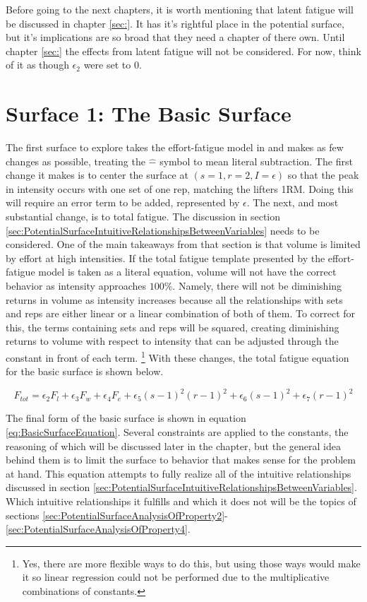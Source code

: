Before going to the next chapters, it is worth mentioning that latent fatigue will be discussed in chapter \ref{sec:}. It has it's rightful place in the potential surface, but it's implications are so broad that they need a chapter of there own. Until chapter \ref{sec:} the effects from latent fatigue will not be considered. For now, think of it as though $\epsilon_2$ were set to $0$. 


\chapter{Surface 1: The Basic Surface}
\label{sec:PotentialSurfaceTheBasicSurface}

The first surface to explore takes the effort-fatigue model in and makes as few changes as possible, treating the $\hat{-}$ symbol to mean literal subtraction. The first change it makes is to center the surface at $(s=1,r=2,I=\epsilon)$ so that the peak in intensity occurs with one set of one rep, matching the lifters 1RM. Doing this will require an error term to be added, represented by $\epsilon$. The next, and most substantial change, is to total fatigue. The discussion in section \ref{sec:PotentialSurfaceIntuitiveRelationshipsBetweenVariables} needs to be considered. One of the main takeaways from that section is that volume is limited by effort at high intensities. If the total fatigue template presented by the effort-fatigue model is taken as a literal equation, volume will not have the correct behavior as intensity approaches $100$\%. Namely, there will not be diminishing returns in volume as intensity increases because all the relationships with sets and reps are either linear or a linear combination of both of them. To correct for this, the terms containing sets and reps will be squared, creating diminishing returns to volume with respect to intensity that can be adjusted through the constant in front of each term. \footnote{Yes, there are more flexible ways to do this, but using those ways would make it so linear regression could not be performed due to the multiplicative combinations of constants.} With these changes, the total fatigue equation for the basic surface is shown below. 

\begin{equation*}
	F_{tot} = \epsilon_2 F_l+\epsilon_3 F_w+\epsilon_4 F_e+\epsilon_5 (s-1)^2(r-1)^2+\epsilon_6 (s-1)^2+\epsilon_7 (r-1)^2
\end{equation*}

The final form of the basic surface is shown in equation \ref{eq:BasicSurfaceEquation}. Several constraints are applied to the constants, the reasoning of which will be discussed later in the chapter, but the general idea behind them is to limit the surface to behavior that makes sense for the problem at hand. This equation attempts to fully realize all of the intuitive relationships discussed in section \ref{sec:PotentialSurfaceIntuitiveRelationshipsBetweenVariables}. Which intuitive relationships it fulfills and which it does not will be the topics of sections \ref{sec:PotentialSurfaceAnalysisOfProperty2}-\ref{sec:PotentialSurfaceAnalysisOfProperty4}.


